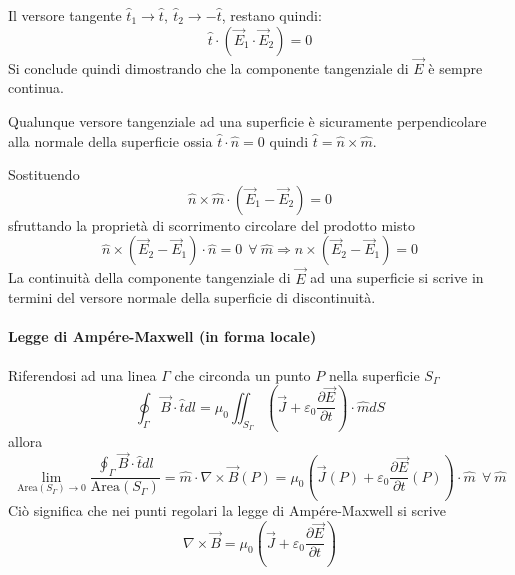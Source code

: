 Il versore tangente $\hat{t}_1 \to \hat{t},\ \hat{t}_2\to -\hat{t}$, restano quindi:
$$
\hat{t}\cdot(\vec{E}_1\cdot\vec{E}_2) = 0
$$
Si conclude quindi dimostrando che la componente tangenziale di $\vec{E}$ è sempre continua.

Qualunque versore tangenziale ad una superficie è sicuramente perpendicolare alla normale della
superficie ossia $\hat{t}\cdot\hat{n} = 0$ quindi $\hat{t} = \hat{n}\times\hat{m}$.

Sostituendo 
$$
\hat{n}\times\hat{m}\cdot(\vec{E}_1-\vec{E}_2) = 0
$$
sfruttando la proprietà di scorrimento circolare del prodotto misto 
$$
\hat{n}\times(\vec{E}_2-\vec{E}_1)\cdot\hat{n} = 0 \ \ \forall\ \hat{m} \Rightarrow
\hat{n}\times(\vec{E}_2-\vec{E}_1) = 0
$$
La continuità della componente tangenziale di $\vec{E}$ ad una superficie si scrive in termini
del versore normale della superficie di discontinuità.

\paragraph{Legge di Ampére-Maxwell (in forma locale)}
Riferendosi ad una linea $\Gamma$ che circonda un punto $P$ nella superficie $S_\Gamma$
$$
\oint_\Gamma\vec{B}\cdot\hat{t}dl = \mu_0 \iint_{S_\Gamma} \left(\vec{J}+\varepsilon_0\frac{\partial \vec{E}}{\partial t}\right)\cdot \hat{m} dS
$$
allora
$$
\lim_{\text{Area}(S_\Gamma)\to 0} \frac{\oint_\Gamma \vec{B}\cdot\hat{t}dl}{\text{Area}(S_\Gamma)} =
\hat{m}\cdot\nabla\times\vec{B}(P) = \mu_0 \left(\vec{J}(P)+\varepsilon_0\frac{\partial\vec{E}}{\partial t}(P)\right)\cdot\hat{m}\ \ \forall\ \hat{m}
$$
Ciò significa che nei punti regolari la legge di Ampére-Maxwell si scrive
\begin{equation}
 \nabla\times\vec{B} = \mu_0\left(\vec{J}+\varepsilon_0\frac{\partial\vec{E}}{\partial t}\right)
\end{equation}

